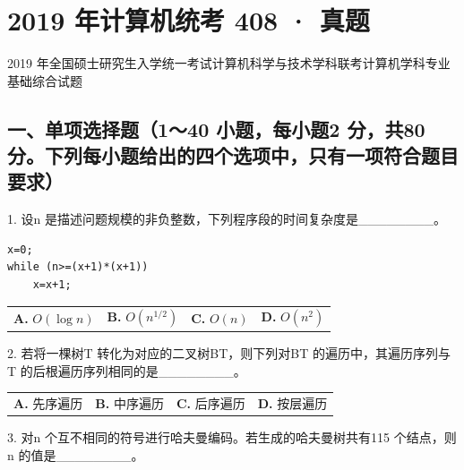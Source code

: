 \documentclass[UTF8,11pt]{ctexart}
\begin{document}
\section*{2019 年计算机统考 408 · 真题}
2019 年全国硕士研究生入学统一考试计算机科学与技术学科联考计算机学科专业基础综合试题


\subsection*{一、单项选择题（1～40 小题，每小题2 分，共80 分。下列每小题给出的四个选项中，只有一项符合题目要求）}

1. 设n 是描述问题规模的非负整数，下列程序段的时间复杂度是\_\_\_\_\_\_\_\_。


\begin{Verbatim}[breaklines,breakanywhere,fontsize=\small]
x=0;
while (n>=(x+1)*(x+1))
    x=x+1;
\end{Verbatim}

\begin{center}\begin{tabular}{>{\raggedright\arraybackslash}p{\dimexpr(\linewidth-8\tabcolsep)/4\relax}>{\raggedright\arraybackslash}p{\dimexpr(\linewidth-8\tabcolsep)/4\relax}>{\raggedright\arraybackslash}p{\dimexpr(\linewidth-8\tabcolsep)/4\relax}>{\raggedright\arraybackslash}p{\dimexpr(\linewidth-8\tabcolsep)/4\relax}}
\textbf{A.} \(\displaystyle O(\log n)\) & \textbf{B.} \(\displaystyle O(n^{1/2})\) & \textbf{C.} \(\displaystyle O(n)\) & \textbf{D.} \(\displaystyle O(n^2)\)\\[.35em]\end{tabular}\end{center}

2. 若将一棵树T 转化为对应的二叉树BT，则下列对BT 的遍历中，其遍历序列与T 的后根遍历序列相同的是\_\_\_\_\_\_\_\_。


\begin{center}\begin{tabular}{>{\raggedright\arraybackslash}p{\dimexpr(\linewidth-8\tabcolsep)/4\relax}>{\raggedright\arraybackslash}p{\dimexpr(\linewidth-8\tabcolsep)/4\relax}>{\raggedright\arraybackslash}p{\dimexpr(\linewidth-8\tabcolsep)/4\relax}>{\raggedright\arraybackslash}p{\dimexpr(\linewidth-8\tabcolsep)/4\relax}}
\textbf{A.} 先序遍历 & \textbf{B.} 中序遍历 & \textbf{C.} 后序遍历 & \textbf{D.} 按层遍历\\[.35em]\end{tabular}\end{center}

3. 对n 个互不相同的符号进行哈夫曼编码。若生成的哈夫曼树共有115 个结点，则n 的值是\_\_\_\_\_\_\_\_。
\end{document}

